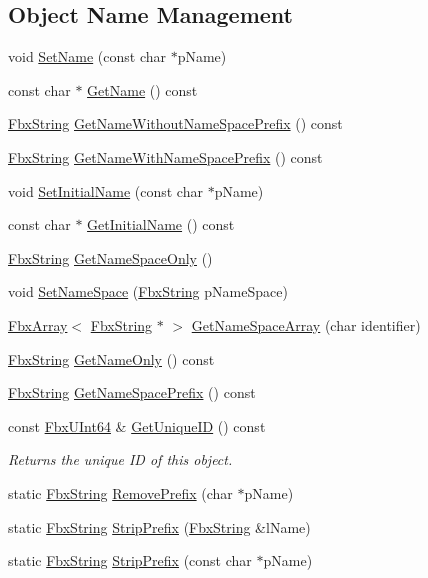 \subsection*{Object Name Management}
\begin{DoxyCompactItemize}
\item 
void \hyperlink{class_fbx_object_aceea1c2fdb26784d668d05dd52df0d68}{Set\+Name} (const char $\ast$p\+Name)
\item 
const char $\ast$ \hyperlink{class_fbx_object_adb6c3656e49af96b64020991b5406ce2}{Get\+Name} () const
\item 
\hyperlink{class_fbx_string}{Fbx\+String} \hyperlink{class_fbx_object_ae378979d85476e931375e30b6498f8db}{Get\+Name\+Without\+Name\+Space\+Prefix} () const
\item 
\hyperlink{class_fbx_string}{Fbx\+String} \hyperlink{class_fbx_object_a9caa594f866ea3a424f5f6e3676e2799}{Get\+Name\+With\+Name\+Space\+Prefix} () const
\item 
void \hyperlink{class_fbx_object_a97b6469f5877e37d352b6f6224791fb2}{Set\+Initial\+Name} (const char $\ast$p\+Name)
\item 
const char $\ast$ \hyperlink{class_fbx_object_adb580039148c2dc765e5aa5cdf985627}{Get\+Initial\+Name} () const
\item 
\hyperlink{class_fbx_string}{Fbx\+String} \hyperlink{class_fbx_object_a9cc9873c1d66722b964c04da5ec2001f}{Get\+Name\+Space\+Only} ()
\item 
void \hyperlink{class_fbx_object_a0546604cdd763f630c9ffdf9cfcf8bdc}{Set\+Name\+Space} (\hyperlink{class_fbx_string}{Fbx\+String} p\+Name\+Space)
\item 
\hyperlink{class_fbx_array}{Fbx\+Array}$<$ \hyperlink{class_fbx_string}{Fbx\+String} $\ast$ $>$ \hyperlink{class_fbx_object_a2367b010ddd5ca21b37b5c7ddff0e781}{Get\+Name\+Space\+Array} (char identifier)
\item 
\hyperlink{class_fbx_string}{Fbx\+String} \hyperlink{class_fbx_object_a3a01a4d055e558d322016ce8d7337329}{Get\+Name\+Only} () const
\item 
\hyperlink{class_fbx_string}{Fbx\+String} \hyperlink{class_fbx_object_a8a0b08d810c3451ea912840caab53694}{Get\+Name\+Space\+Prefix} () const
\item 
const \hyperlink{fbxtypes_8h_a9beeca85cdc9941e912fe9eac7709b53}{Fbx\+U\+Int64} \& \hyperlink{class_fbx_object_a30e02c36e4adf5e42499c1f39ebfae08}{Get\+Unique\+ID} () const
\begin{DoxyCompactList}\small\item\em Returns the unique ID of this object. \end{DoxyCompactList}\item 
static \hyperlink{class_fbx_string}{Fbx\+String} \hyperlink{class_fbx_object_aa4a97de3c9d2d74d7b58f579ad3ad453}{Remove\+Prefix} (char $\ast$p\+Name)
\item 
static \hyperlink{class_fbx_string}{Fbx\+String} \hyperlink{class_fbx_object_aef0a016a9b53593f537b68ba47b8dd6e}{Strip\+Prefix} (\hyperlink{class_fbx_string}{Fbx\+String} \&l\+Name)
\item 
static \hyperlink{class_fbx_string}{Fbx\+String} \hyperlink{class_fbx_object_a23b53eecb8b6b7d198496392dc987548}{Strip\+Prefix} (const char $\ast$p\+Name)
\end{DoxyCompactItemize}
